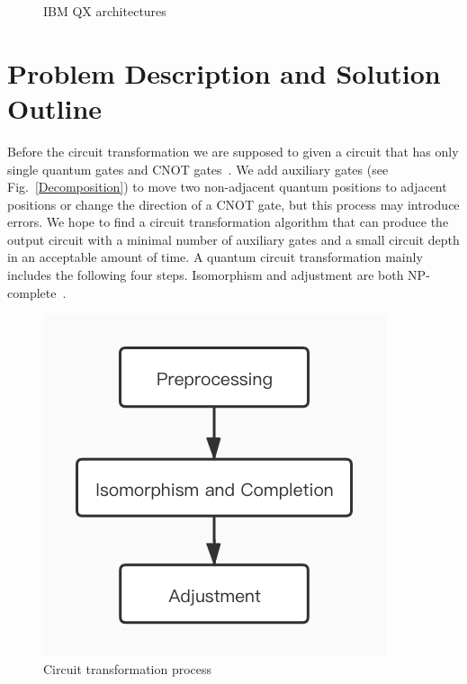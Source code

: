 \documentclass[runningheads]{llncs}
\begin{document}
\begin{figure}
{
}
\caption{IBM QX architectures}
\label{IBM}
\end{figure}


\section{Problem Description and Solution Outline}
\label{Problem Description and Solution Outline}
Before the circuit transformation we are supposed to given a circuit that has only single quantum gates and CNOT gates~\cite{1995Barenco,2005Mttnen}. We add auxiliary gates (see Fig.~\ref{Decomposition}) to move two non-adjacent quantum positions to adjacent positions or change the direction of a CNOT gate, but this process may introduce errors.
We hope to find a circuit transformation algorithm that can produce the output circuit with a minimal number of auxiliary gates and a small circuit depth in an acceptable amount of time.
A quantum circuit transformation mainly includes the following four steps. Isomorphism and adjustment are both NP-complete~\cite{2018QubitSiraichi}.
\begin{figure}[h!] 
	\centering
	\includegraphics[scale=0.4]{uml.jpg}		 
	\caption{Circuit transformation process}
	\label{processing}	
	 \end{figure}
\end{document}
